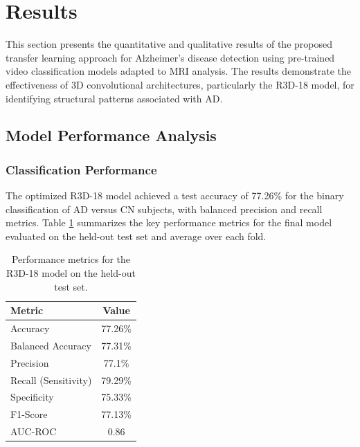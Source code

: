 \documentclass[11pt, a4paper]{article}
\begin{document}

\section{Results}
\label{sec:results}

This section presents the quantitative and qualitative results of the proposed transfer learning approach for Alzheimer's disease detection using pre-trained video classification models adapted to MRI analysis. The results demonstrate the effectiveness of 3D convolutional architectures, particularly the R3D-18 model, for identifying structural patterns associated with AD.

\subsection{Model Performance Analysis}

\subsubsection{Classification Performance}

The optimized R3D-18 model achieved a test accuracy of 77.26\% for the binary classification of AD versus CN subjects, with balanced precision and recall metrics. Table \ref{tab:performance_metrics} summarizes the key performance metrics for the final model evaluated on the held-out test set and average over each fold.

\begin{table}[htbp]
\centering
\begin{tabular}{|l|c|}
\hline
\textbf{Metric} & \textbf{Value} \\
\hline
Accuracy & 77.26\% \\
Balanced Accuracy & 77.31\% \\
Precision & 77.1\% \\
Recall (Sensitivity) & 79.29\% \\
Specificity & 75.33\% \\
F1-Score & 77.13\% \\
AUC-ROC & 0.86 \\
\hline
\end{tabular}
\caption{Performance metrics for the R3D-18 model on the held-out test set.}
\label{tab:performance_metrics}
\end{table}
\end{document}
